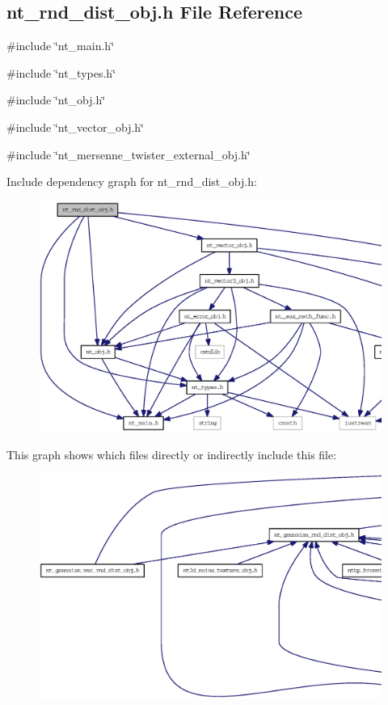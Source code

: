 \subsection{nt\_\-rnd\_\-dist\_\-obj.h File Reference}
\label{nt__rnd__dist__obj_8h}
{\ttfamily \#include \char`\"{}nt\_\-main.h\char`\"{}}\par
{\ttfamily \#include \char`\"{}nt\_\-types.h\char`\"{}}\par
{\ttfamily \#include \char`\"{}nt\_\-obj.h\char`\"{}}\par
{\ttfamily \#include \char`\"{}nt\_\-vector\_\-obj.h\char`\"{}}\par
{\ttfamily \#include \char`\"{}nt\_\-mersenne\_\-twister\_\-external\_\-obj.h\char`\"{}}\par
Include dependency graph for nt\_\-rnd\_\-dist\_\-obj.h:
\nopagebreak
\begin{figure}[H]
\begin{center}
\leavevmode
\includegraphics[width=400pt]{nt__rnd__dist__obj_8h__incl}
\end{center}
\end{figure}
This graph shows which files directly or indirectly include this file:
\nopagebreak
\begin{figure}[H]
\begin{center}
\leavevmode
\includegraphics[width=400pt]{nt__rnd__dist__obj_8h__dep__incl}
\end{center}
\end{figure}
